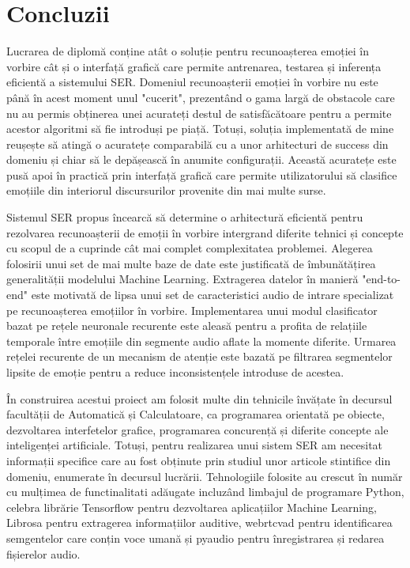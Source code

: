 \documentclass[a4paper,12pt]{book}
\begin{document}
		\chapter{Concluzii}		
		Lucrarea de diplomă conține atât o soluție pentru recunoașterea emoției în vorbire cât și o interfață grafică care permite antrenarea, testarea și inferența eficientă a sistemului SER. Domeniul recunoașterii emoției în vorbire nu este până în acest moment unul "cucerit", prezentând o gama largă de obstacole care nu au permis obținerea unei acurateți destul de satisfăcătoare pentru a permite acestor algoritmi să fie introduși pe piață. Totuși, soluția implementată de mine reușește să atingă o acuratețe comparabilă cu a unor arhitecturi de success din domeniu și chiar să le depășească în anumite configurații. Această acuratețe este pusă apoi în practică prin interfață grafică care permite utilizatorului să clasifice emoțiile din interiorul discursurilor provenite din mai multe surse. \par		
		
		Sistemul SER propus încearcă să determine o arhitectură eficientă pentru rezolvarea recunoașterii de emoții în vorbire intergrand diferite tehnici și concepte cu scopul de a cuprinde cât mai complet complexitatea problemei. Alegerea folosirii unui set de mai multe baze de date este justificată de îmbunătățirea generalității modelului Machine Learning. Extragerea datelor în manieră "end-to-end" este motivată de lipsa unui set de caracteristici audio de intrare specializat pe recunoașterea emoțiilor în vorbire. Implementarea unui modul clasificator bazat pe rețele neuronale recurente este aleasă pentru a profita de relațiile temporale între emoțiile din segmente audio aflate la momente diferite. Urmarea rețelei recurente de un mecanism de atenție este bazată pe filtrarea segmentelor lipsite de emoție pentru a reduce inconsistențele introduse de acestea. \par
		
		În construirea acestui proiect am folosit multe din tehnicile învățate în decursul facultății de Automatică și Calculatoare, ca programarea orientată pe obiecte, dezvoltarea interfetelor grafice, programarea concurență și diferite concepte ale inteligenței artificiale. Totuși, pentru realizarea unui sistem SER am necesitat informații specifice care au fost obținute prin studiul unor articole stintifice din domeniu, enumerate în decursul lucrării. Tehnologiile folosite au crescut în număr cu mulțimea de functinalitati adăugate incluzând limbajul de programare Python, celebra librărie Tensorflow pentru dezvoltarea aplicațiilor Machine Learning, Librosa pentru extragerea informațiilor auditive, webrtcvad pentru identificarea semgentelor care conțin voce umană și pyaudio pentru înregistrarea și redarea fișierelor audio. \par
		
\end{document}
